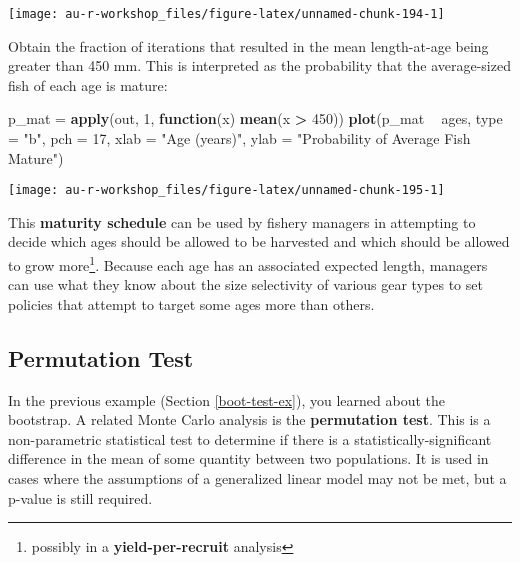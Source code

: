 \documentclass[]{book}
\newenvironment{Shaded}{\begin{snugshade}}{\end{snugshade}}
\newcommand{\KeywordTok}[1]{\textcolor[rgb]{0.13,0.29,0.53}{\textbf{#1}}}
\newcommand{\DataTypeTok}[1]{\textcolor[rgb]{0.13,0.29,0.53}{#1}}
\newcommand{\DecValTok}[1]{\textcolor[rgb]{0.00,0.00,0.81}{#1}}
\newcommand{\StringTok}[1]{\textcolor[rgb]{0.31,0.60,0.02}{#1}}
\newcommand{\ControlFlowTok}[1]{\textcolor[rgb]{0.13,0.29,0.53}{\textbf{#1}}}
\newcommand{\OperatorTok}[1]{\textcolor[rgb]{0.81,0.36,0.00}{\textbf{#1}}}
\newcommand{\NormalTok}[1]{#1}
\let\rmarkdownfootnote\footnote%
\def\footnote{\protect\rmarkdownfootnote}
\theoremstyle{definition}
\theoremstyle{definition}
\theoremstyle{definition}
\theoremstyle{remark}
\begin{document}
\begin{center}\texttt{[image: au-r-workshop\_files/figure-latex/unnamed-chunk-194-1]} \end{center}

Obtain the fraction of iterations that resulted in the mean
length-at-age being greater than 450 mm. This is interpreted as the
probability that the average-sized fish of each age is mature:

\begin{Shaded}
\begin{Highlighting}[]
\NormalTok{p_mat =}\StringTok{ }\KeywordTok{apply}\NormalTok{(out, }\DecValTok{1}\NormalTok{, }\ControlFlowTok{function}\NormalTok{(x) }\KeywordTok{mean}\NormalTok{(x }\OperatorTok{>}\StringTok{ }\DecValTok{450}\NormalTok{))}
\KeywordTok{plot}\NormalTok{(p_mat }\OperatorTok{~}\StringTok{ }\NormalTok{ages, }\DataTypeTok{type =} \StringTok{"b"}\NormalTok{, }\DataTypeTok{pch =} \DecValTok{17}\NormalTok{,}
     \DataTypeTok{xlab =} \StringTok{"Age (years)"}\NormalTok{, }\DataTypeTok{ylab =} \StringTok{"Probability of Average Fish Mature"}\NormalTok{)}
\end{Highlighting}
\end{Shaded}

\begin{center}\texttt{[image: au-r-workshop\_files/figure-latex/unnamed-chunk-195-1]} \end{center}

This \textbf{maturity schedule} can be used by fishery managers in
attempting to decide which ages should be allowed to be harvested and
which should be allowed to grow more\footnote{possibly in a
  \textbf{yield-per-recruit} analysis}. Because each age has an
associated expected length, managers can use what they know about the
size selectivity of various gear types to set policies that attempt to
target some ages more than others.

\subsection{Permutation Test}\label{perm-test-ex}

In the previous example (Section \ref{boot-test-ex}), you learned about
the bootstrap. A related Monte Carlo analysis is the \textbf{permutation
test}. This is a non-parametric statistical test to determine if there
is a statistically-significant difference in the mean of some quantity
between two populations. It is used in cases where the assumptions of a
generalized linear model may not be met, but a p-value is still
required.
\end{document}
